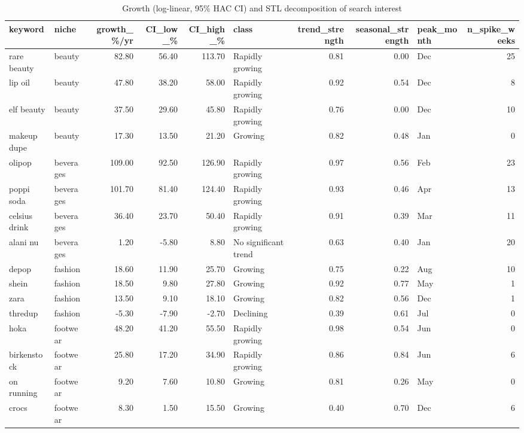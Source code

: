 \begin{table}[t]
\scriptsize
\centering
\caption{Growth (log-linear, 95\% HAC CI) and STL decomposition of search interest}
\label{tab:search_growth}
\begin{tabular}{llrrrlrrlr}
\toprule
keyword & niche & growth\_\%/yr & CI\_low\_\% & CI\_high\_\% & class & trend\_strength & seasonal\_strength & peak\_month & n\_spike\_weeks \\
\midrule
rare beauty & beauty & 82.80 & 56.40 & 113.70 & Rapidly growing & 0.81 & 0.00 & Dec & 25 \\
lip oil & beauty & 47.80 & 38.20 & 58.00 & Rapidly growing & 0.92 & 0.54 & Dec & 8 \\
elf beauty & beauty & 37.50 & 29.60 & 45.80 & Rapidly growing & 0.76 & 0.00 & Dec & 10 \\
makeup dupe & beauty & 17.30 & 13.50 & 21.20 & Growing & 0.82 & 0.48 & Jan & 0 \\
olipop & beverages & 109.00 & 92.50 & 126.90 & Rapidly growing & 0.97 & 0.56 & Feb & 23 \\
poppi soda & beverages & 101.70 & 81.40 & 124.40 & Rapidly growing & 0.93 & 0.46 & Apr & 13 \\
celsius drink & beverages & 36.40 & 23.70 & 50.40 & Rapidly growing & 0.91 & 0.39 & Mar & 11 \\
alani nu & beverages & 1.20 & -5.80 & 8.80 & No significant trend & 0.63 & 0.40 & Jan & 20 \\
depop & fashion & 18.60 & 11.90 & 25.70 & Growing & 0.75 & 0.22 & Aug & 10 \\
shein & fashion & 18.50 & 9.80 & 27.80 & Growing & 0.92 & 0.77 & May & 1 \\
zara & fashion & 13.50 & 9.10 & 18.10 & Growing & 0.82 & 0.56 & Dec & 1 \\
thredup & fashion & -5.30 & -7.90 & -2.70 & Declining & 0.39 & 0.61 & Jul & 0 \\
hoka & footwear & 48.20 & 41.20 & 55.50 & Rapidly growing & 0.98 & 0.54 & Jun & 0 \\
birkenstock & footwear & 25.80 & 17.20 & 34.90 & Rapidly growing & 0.86 & 0.84 & Jun & 6 \\
on running & footwear & 9.20 & 7.60 & 10.80 & Growing & 0.81 & 0.26 & May & 0 \\
crocs & footwear & 8.30 & 1.50 & 15.50 & Growing & 0.40 & 0.70 & Dec & 6 \\
\bottomrule
\end{tabular}
\end{table}
